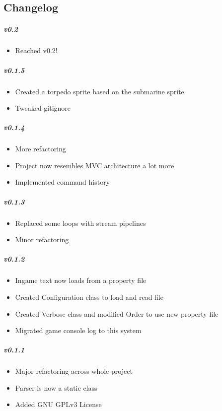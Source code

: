 \subsection*{Changelog}

\subparagraph{v0.2}

\begin{itemize}[noitemsep]
\item
  Reached v0.2!
\end{itemize}

\subparagraph{v0.1.5}

\begin{itemize}[noitemsep]
\item
  Created a torpedo sprite based on the submarine sprite
\item
  Tweaked gitignore
\end{itemize}

\subparagraph{v0.1.4}

\begin{itemize}[noitemsep]
\item
  More refactoring
\item
  Project now resembles MVC architecture a lot more
\item
  Implemented command history
\end{itemize}

\subparagraph{v0.1.3}

\begin{itemize}[noitemsep]
\item
  Replaced some loops with stream pipelines
\item
  Minor refactoring
\end{itemize}

\subparagraph{v0.1.2}

\begin{itemize}[noitemsep]
\item
  Ingame text now loads from a property file
\item
  Created Configuration class to load and read file
\item
  Created Verbose class and modified Order to use new property file
\item
  Migrated game console log to this system
\end{itemize}

\subparagraph{v0.1.1}

\begin{itemize}[noitemsep]
\item
  Major refactoring across whole project
\item
  Parser is now a static class
\item
  Added GNU GPLv3 License
\end{itemize}

